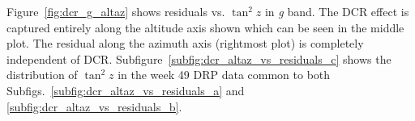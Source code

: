 Figure~\ref{fig:dcr_g_altaz} shows residuals vs. $\tan^2{z}$ in {\it g} band. 
The DCR effect is captured entirely along the altitude axis shown which can be seen in the middle plot. 
The residual along the azimuth axis (rightmost plot) is completely independent of DCR.
Subfigure~\ref{subfig:dcr_altaz_vs_residuals_c} shows the distribution of $\tan^2{z}$ in the week 49 DRP data common to both Subfigs.~\ref{subfig:dcr_altaz_vs_residuals_a} and \ref{subfig:dcr_altaz_vs_residuals_b}.